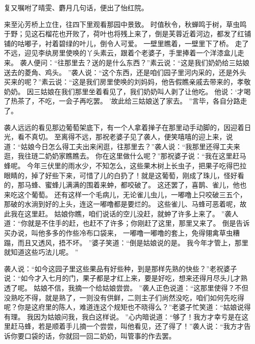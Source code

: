复又嘱咐了晴雯、麝月几句话，便出了怡红院。
\par
来至沁芳桥上立住，往四下里观看那园中景致。
时值秋令，秋蝉鸣于树，草虫鸣于野；见这石榴花也开败了，荷叶也将残上来了，倒是芙蓉近着河边，都发了红铺铺的咕嘟子，衬着碧绿的叶儿，倒令人可爱。
一壁里瞧着，一壁里下了桥。
走了不远，迎见李纨房里使唤的丫头素云，跟着个老婆子，手里捧着一个洋漆盒儿走来。
袭人便问：“往那里去？送的是什么东西？”素云说：“这是我们奶奶给三姑娘送去的菱角、鸡头。
”袭人说：“这个东西，还是咱们园子里河内采的，还是外头买来的呢？”素云说：“这是我们房里使唤的刘妈妈，他告假瞧亲戚去带来的，孝敬奶奶。
因三姑娘在我们那里坐着看见了，我们奶奶叫人剥了让他吃。
他说：‘才喝了热茶了，不吃，一会子再吃罢。
’故此给三姑娘送了家去。
”言毕，各自分路走了。
\par
袭人远远的看见那边葡萄架底下，有一个人拿着掸子在那里动手动脚的，因迎着日光，看不真切。
至离得不远，那祝老婆子见了袭人，便笑嘻嘻的迎上来，说道：“姑娘今日怎么得工夫出来闲逛，往那里去？”袭人说：“我那里还得工夫来逛，我往琏二奶奶家瞧瞧去。
你在这里做什么呢？”那祝婆子说：“我在这里赶马蜂呢。
今年三伏里的雨水少，不知怎么，这些果木树上长虫子，把果子吃得巴拉眼睛的，掉了好些下来，可惜了儿的白扔了！就是这葡萄，刚成了珠儿，怪好看的，那马蜂、蜜蜂儿满满的围着来蚛，都咬破了。
这还罢了，喜鹊、雀儿，他也来吃这个葡萄。
还有这样一个毛病儿，无论雀儿虫儿，一嘟噜上只咬破三五个，那破的水淌到好的上头，连这一嘟噜都是要烂的。
这些雀儿、马蜂可恶着呢，故此我在这里赶。
姑娘你瞧，咱们说话的空儿没赶，就蚛了许多上来了。
”袭人道：“你就是不住手的赶，也赶不了许多；你刚赶了这里，那里又来了。
倒是告诉买办说，叫他多多的作些冷布口袋来，
一嘟噜一嘟噜的套上，免得翎禽草虫糟蹋，而且又透风，捂不坏。
”婆子笑道：“倒是姑娘说的是。
我今年才管上，那里就知道这些巧法儿呢。
”\par
袭人说：“如今这园子里这些果品有好些种，到是那样先熟的快些？”老祝婆子说：“如今才入七月的门，果子都是才红上来，要是好吃，想来还得月尽头儿才熟透了呢。
姑娘不信，我摘一个给姑娘尝尝。
”袭人正色说道：“这那里使得？不但没熟吃不得，就是熟了，一则没有供鲜，二则主子们尚然没吃，咱们如何先吃得呢？你是这府里的陈人，难道连这个规矩也不晓得么？”老婆子忙笑道：“姑娘说得有理。
我因为姑娘问我，我白这样说。
”心内暗说道：“够了！我方才幸亏是在这里赶马蜂，若是顺着手儿摘一个尝尝，叫他看见，还了得了！”袭人说：“我方才告诉你要口袋的话，你就回一回二奶奶，叫管事的作去罢。
